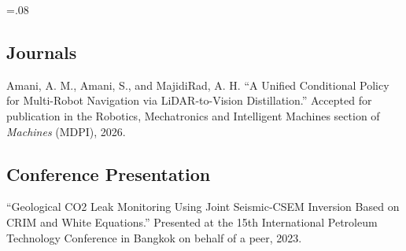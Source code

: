 \documentclass[
  a4paper, 
   maincolor=cvblue,
   sectioncolor=cvblue,
]{fortysecondscv}
\begin{document}
\begin{cvtable}
\end{cvtable}

\newpage
\makethirdsidebar
\sidebarwidth=.08\paperwidth
{}

\subsection{Journals}
\begin{itemize}
{\small
\item Amani, A. M., Amani, S., and MajidiRad, A. H. ``A Unified Conditional Policy for Multi-Robot Navigation via LiDAR-to-Vision Distillation.'' Accepted for publication in the Robotics, Mechatronics and Intelligent Machines section of \textit{Machines} (MDPI), 2026.}
\end{itemize}
\vskip20pt
\subsection{Conference Presentation}
\begin{itemize}
{\small
\item ``Geological CO2 Leak Monitoring Using Joint Seismic-CSEM Inversion Based on CRIM and White Equations.'' Presented at the 15th International Petroleum Technology Conference in Bangkok on behalf of a peer, 2023.}
\end{itemize}

\end{document}
